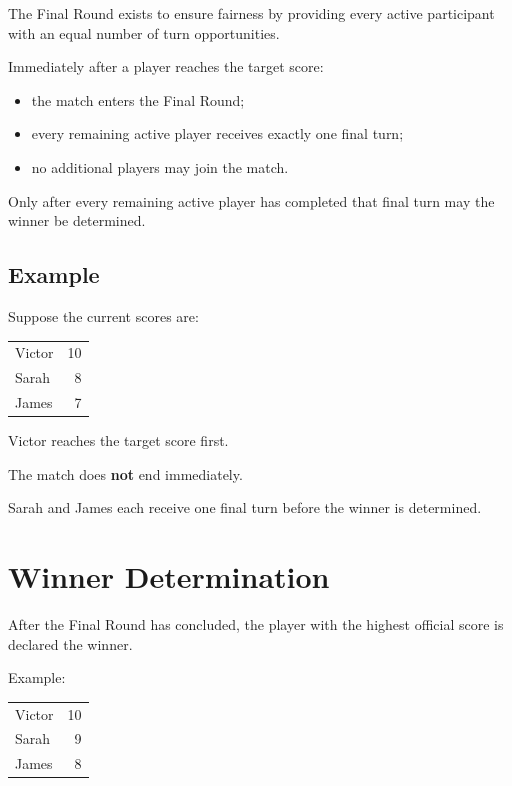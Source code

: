 \documentclass[11pt,a4paper]{article}
\begin{document}
The Final Round exists to ensure fairness by providing every active participant with an equal number of turn opportunities.

Immediately after a player reaches the target score:

\begin{itemize}
    \item the match enters the Final Round;
    \item every remaining active player receives exactly one final turn;
    \item no additional players may join the match.
\end{itemize}

Only after every remaining active player has completed that final turn may the winner be determined.

\subsection{Example}

Suppose the current scores are:

\begin{center}
\begin{tabular}{lr}
\toprule
Victor & 10 \\
Sarah & 8 \\
James & 7 \\
\bottomrule
\end{tabular}
\end{center}

Victor reaches the target score first.

The match does \textbf{not} end immediately.

Sarah and James each receive one final turn before the winner is determined.

\section{Winner Determination}

After the Final Round has concluded, the player with the highest official score is declared the winner.

Example:

\begin{center}
\begin{tabular}{lr}
\toprule
Victor & 10 \\
Sarah & 9 \\
James & 8 \\
\bottomrule
\end{tabular}
\end{center}
\end{document}
